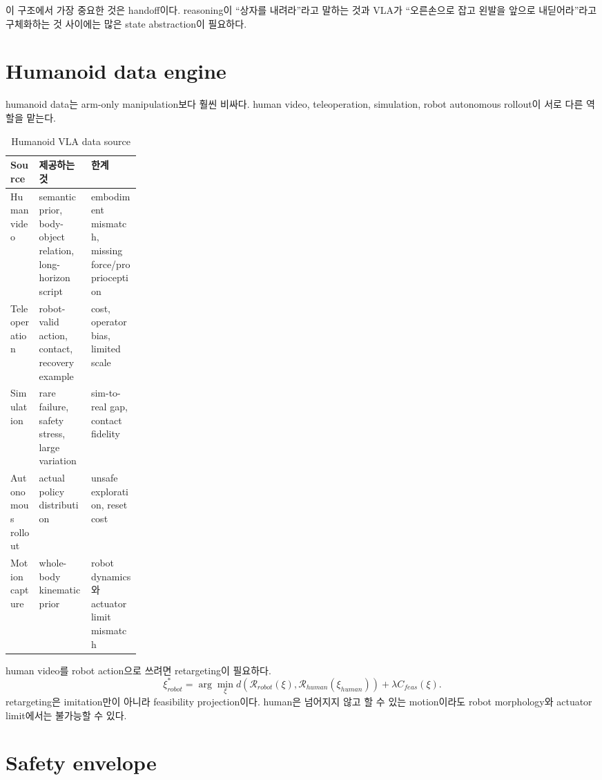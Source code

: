 이 구조에서 가장 중요한 것은 handoff이다. reasoning이 ``상자를 내려라''라고 말하는 것과 VLA가 ``오른손으로 잡고 왼발을 앞으로 내딛어라''라고 구체화하는 것 사이에는 많은 state abstraction이 필요하다.

\section{Humanoid data engine}

humanoid data는 arm-only manipulation보다 훨씬 비싸다. human video, teleoperation, simulation, robot autonomous rollout이 서로 다른 역할을 맡는다.

\begin{table}[h]
  \centering
  \caption{Humanoid VLA data source}
  \begin{tabularx}{\linewidth}{p{0.22\linewidth}X X}
    \toprule
    Source & 제공하는 것 & 한계 \\
    \midrule
    Human video & semantic prior, body-object relation, long-horizon script & embodiment mismatch, missing force/proprioception \\
    Teleoperation & robot-valid action, contact, recovery example & cost, operator bias, limited scale \\
    Simulation & rare failure, safety stress, large variation & sim-to-real gap, contact fidelity \\
    Autonomous rollout & actual policy distribution & unsafe exploration, reset cost \\
    Motion capture & whole-body kinematic prior & robot dynamics와 actuator limit mismatch \\
    \bottomrule
  \end{tabularx}
  \label{tab:ch20-data}
\end{table}

human video를 robot action으로 쓰려면 retargeting이 필요하다.
\begin{equation}
  \xi_{robot}^{*}
  =
  \arg\min_{\xi}
  d(
  \mathcal{R}_{robot}(\xi),
  \mathcal{R}_{human}(\xi_{human})
  )
  +
  \lambda C_{feas}(\xi).
  \label{eq:ch20-retargeting}
\end{equation}
retargeting은 imitation만이 아니라 feasibility projection이다. human은 넘어지지 않고 할 수 있는 motion이라도 robot morphology와 actuator limit에서는 불가능할 수 있다.

\section{Safety envelope}

